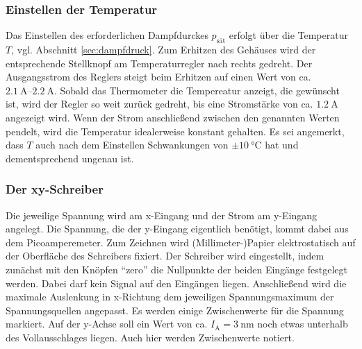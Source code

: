 \subsubsection{Einstellen der Temperatur}
Das Einstellen des erforderlichen Dampfdurckes $p_\text{sät}$ erfolgt über die Temperatur $T$, vgl. Abschnitt \ref{sec:dampfdruck}.
Zum Erhitzen des Gehäuses wird der entsprechende Stellknopf am Temperaturregler nach rechts gedreht. 
Der Ausgangsstrom des Reglers steigt beim Erhitzen auf einen Wert von ca. $\qtyrange[]{2.1}{2.2}{\ampere}$.
Sobald das Thermometer die Tempereatur anzeigt, die gewünscht ist, wird der Regler so weit zurück gedreht, bis eine Stromstärke von ca. $\qty[]{1.2}{\ampere}$ angezeigt wird.
Wenn der Strom anschließend zwischen den genannten Werten pendelt, wird die Temperatur idealerweise konstant gehalten.
Es sei angemerkt, dass $T$ auch nach dem Einstellen Schwankungen von $\pm \qty[]{10}{\celsius}$ hat und dementsprechend ungenau ist.

\subsubsection{Der xy-Schreiber}
Die jeweilige Spannung wird am x-Eingang und der Strom am y-Eingang angelegt.
Die Spannung, die der y-Eingang eigentlich benötigt, kommt dabei aus dem Picoamperemeter.
Zum Zeichnen wird (Millimeter-)Papier elektrostatisch auf der Oberfläche des Schreibers fixiert. 
Der Schreiber wird eingestellt, indem zunächst mit den Knöpfen \enquote{zero} die Nullpunkte der beiden Eingänge festgelegt werden.
Dabei darf kein Signal auf den Eingängen liegen.
Anschließend wird die maximale Auslenkung in x-Richtung dem jeweiligen Spannungsmaximum der Spannungsquellen angepasst.
Es werden einige Zwischenwerte für die Spannung markiert.
Auf der y-Achse soll ein Wert von ca. $I_\text{A} = \qty[]{3}{\nano\meter}$ noch etwas unterhalb des Vollausschlages liegen. 
Auch hier werden Zwischenwerte notiert.


